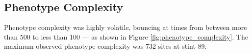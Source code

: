 \clearpage
\onecolumn



\clearpage
\twocolumn





\subsection{Phenotype Complexity}



Phenotype complexity was highly volatile, bouncing at times from between more than 500 to less than 100 --- as shown in Figure \ref{fig:phenotype_complexity}.
The maximum observed phenotype complexity was 732 sites at stint 89.
















\clearpage
\onecolumn



\twocolumn









